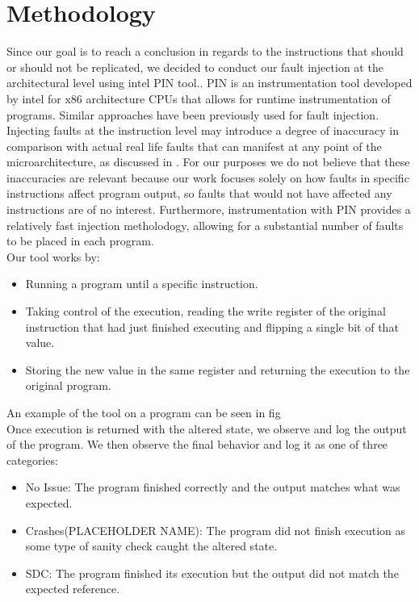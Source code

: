 \documentclass[lettersize,journal]{IEEEtran}
\begin{document}
\section{Methodology}
Since our goal is to reach a conclusion in regards to the instructions that should or should not be replicated, we decided to conduct our fault injection at the architectural level using intel PIN tool.\cite{luk2005pin}. PIN is an instrumentation tool developed by intel for x86 architecture CPUs that allows for runtime instrumentation of programs. Similar approaches have been previously used for fault injection.\cite{wei2014quantifying}\\
Injecting faults at the instruction level may introduce a degree of inaccuracy in comparison with actual real life faults that can manifest at any point of the microarchitecture, as discussed in \cite{cho2013quantitative}. For our purposes we do not believe that these inaccuracies are relevant because our work focuses solely on how faults in specific instructions affect program output, so faults that would not have affected any instructions are of no interest. Furthermore, instrumentation with PIN provides a relatively fast injection metholodogy, allowing for a substantial number of faults to be placed in each program.\\
Our tool works by:
\begin{itemize}
    \item Running a program until a specific instruction.
    \item Taking control of the execution, reading the write register of the original instruction that had just finished executing and flipping a single bit of that value.
    \item Storing the new value in the same register and returning the execution to the original program.
\end{itemize} 
An example of the tool on a program can be seen in fig\\
Once execution is returned with the altered state, we observe and log the output of the program. We then observe the final behavior and log it as one of three categories:
\begin{itemize}
    \item No Issue: The program finished correctly and the output matches what was expected.
    \item Crashes(PLACEHOLDER NAME): The program did not finish execution as some type of sanity check caught the altered state.
    \item SDC: The program finished its execution but the output did not match the expected reference.
\end{itemize}
\end{document}

